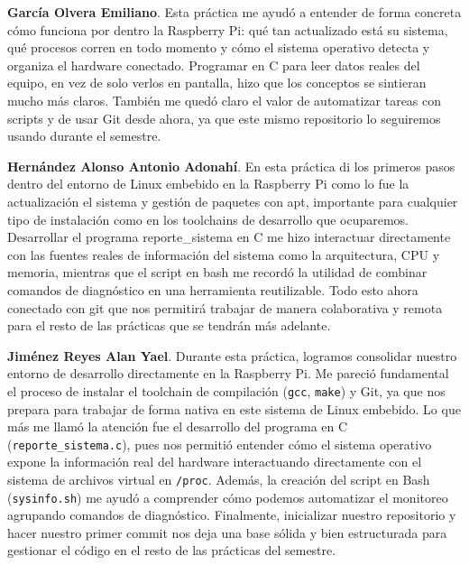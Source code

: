 \documentclass[conference]{IEEEtran}
\begin{document}
\textbf{García Olvera Emiliano}. Esta práctica me ayudó a entender de forma concreta cómo funciona por dentro la Raspberry Pi: qué tan actualizado está su sistema, qué procesos corren en todo momento y cómo el sistema operativo detecta y organiza el hardware conectado. Programar en C para leer datos reales del equipo, en vez de solo verlos en pantalla, hizo que los conceptos se sintieran mucho más claros. También me quedó claro el valor de automatizar tareas con scripts y de usar Git desde ahora, ya que este mismo repositorio lo seguiremos usando durante el semestre.

\textbf{Hernández Alonso Antonio Adonahí}. En esta práctica di los primeros pasos dentro del entorno de Linux embebido en la Raspberry Pi como lo fue la actualización el sistema y gestión de paquetes con apt, importante para cualquier tipo de instalación como en los toolchains de desarrollo que ocuparemos. Desarrollar el programa reporte\_sistema en C me hizo interactuar directamente con las fuentes reales de información del sistema como la arquitectura, CPU y memoria, mientras que el script en bash me recordó la utilidad de combinar comandos de diagnóstico en una herramienta reutilizable. Todo esto ahora conectado con git que nos permitirá trabajar de manera colaborativa y remota para el resto de las prácticas que se tendrán más adelante.

\textbf{Jiménez Reyes Alan Yael}. Durante esta práctica, logramos consolidar nuestro entorno de desarrollo directamente en la Raspberry Pi. Me pareció fundamental el proceso de instalar el toolchain de compilación (\texttt{gcc}, \texttt{make}) y Git, ya que nos prepara para trabajar de forma nativa en este sistema de Linux embebido. Lo que más me llamó la atención fue el desarrollo del programa en C (\texttt{reporte\_sistema.c}), pues nos permitió entender cómo el sistema operativo expone la información real del hardware interactuando directamente con el sistema de archivos virtual en \texttt{/proc}. Además, la creación del script en Bash (\texttt{sysinfo.sh}) me ayudó a comprender cómo podemos automatizar el monitoreo agrupando comandos de diagnóstico. Finalmente, inicializar nuestro repositorio y hacer nuestro primer commit nos deja una base sólida y bien estructurada para gestionar el código en el resto de las prácticas del semestre.
\end{document}

